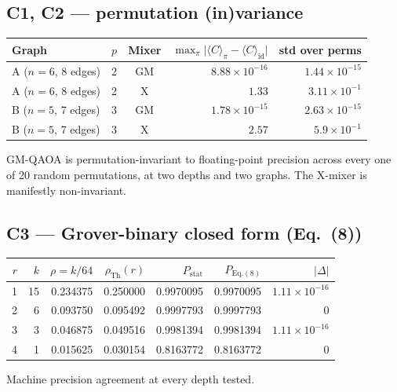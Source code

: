 \documentclass[11pt]{article}
\begin{document}
\subsection{C1, C2 --- permutation (in)variance}
\begin{center}
\begin{tabular}{lccrr}
\toprule
Graph & $p$ & Mixer & $\max_\pi\lvert\langle C\rangle_\pi - \langle C\rangle_{\mathrm{id}}\rvert$ & std over perms \\
\midrule
A ($n=6$, 8 edges) & 2 & GM & $8.88\times 10^{-16}$ & $1.44\times 10^{-15}$ \\
A ($n=6$, 8 edges) & 2 & X  & $1.33$                 & $3.11\times 10^{-1}$ \\
B ($n=5$, 7 edges) & 3 & GM & $1.78\times 10^{-15}$ & $2.63\times 10^{-15}$ \\
B ($n=5$, 7 edges) & 3 & X  & $2.57$                 & $5.9\times 10^{-1}$ \\
\bottomrule
\end{tabular}
\end{center}
GM-QAOA is permutation-invariant to floating-point precision across every one of 20 random permutations, at two depths and two graphs. The X-mixer is manifestly non-invariant.

\subsection{C3 --- Grover-binary closed form (Eq.~(8))}
\begin{center}
\begin{tabular}{rrrrrrr}
\toprule
$r$ & $k$ & $\rho=k/64$ & $\rho_{\mathrm{Th}}(r)$ & $P_{\mathrm{stat}}$ & $P_{\mathrm{Eq.(8)}}$ & $\lvert\Delta\rvert$ \\
\midrule
1 & 15 & 0.234375 & 0.250000 & 0.9970095 & 0.9970095 & $1.11\times 10^{-16}$ \\
2 &  6 & 0.093750 & 0.095492 & 0.9997793 & 0.9997793 & 0 \\
3 &  3 & 0.046875 & 0.049516 & 0.9981394 & 0.9981394 & $1.11\times 10^{-16}$ \\
4 &  1 & 0.015625 & 0.030154 & 0.8163772 & 0.8163772 & 0 \\
\bottomrule
\end{tabular}
\end{center}
Machine precision agreement at every depth tested.
\end{document}
